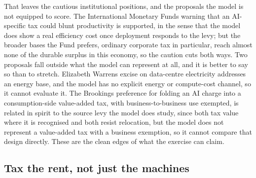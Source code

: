 \documentclass[11pt]{article}
\begin{document}
That leaves the cautious institutional positions, and the proposals the
model is not equipped to score. The International Monetary
Fund\textquotesingle s warning that an AI-specific tax could blunt
productivity is supported, in the sense that the model does show a real
efficiency cost once deployment responds to the levy; but the broader
bases the Fund prefers, ordinary corporate tax in particular, reach
almost none of the durable surplus in this economy, so the caution cuts
both ways. Two proposals fall outside what the model can represent at
all, and it is better to say so than to stretch. Elizabeth
Warren\textquotesingle s excise on data-centre electricity addresses an
energy base, and the model has no explicit energy or compute-cost
channel, so it cannot evaluate it. The Brookings preference for folding
an AI charge into a consumption-side value-added tax, with
business-to-business use exempted, is related in spirit to the source
levy the model does study, since both tax value where it is recognised
and both resist relocation, but the model does not represent a
value-added tax with a business exemption, so it cannot compare that
design directly. These are the clean edges of what the exercise can
claim.

\hypertarget{tax-the-rent-not-just-the-machines}{%
\subsection{Tax the rent, not just the
machines}\label{tax-the-rent-not-just-the-machines}}
\end{document}
